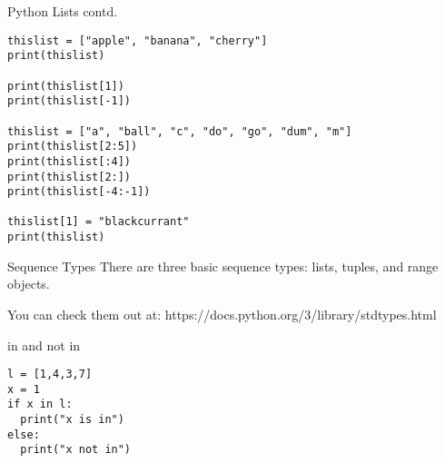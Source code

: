 \documentclass{beamer}
\begin{document}
\begin{frame}[fragile]{Python Lists contd.}
	\begin{verbatim}
thislist = ["apple", "banana", "cherry"]
print(thislist)
	
print(thislist[1])
print(thislist[-1])

thislist = ["a", "ball", "c", "do", "go", "dum", "m"]
print(thislist[2:5])
print(thislist[:4])
print(thislist[2:])
print(thislist[-4:-1])

thislist[1] = "blackcurrant"
print(thislist)
	\end{verbatim}
\end{frame}


\begin{frame}{Sequence Types}
	There are three basic sequence types: lists, tuples, and range objects. 

	You can check them out at: https://docs.python.org/3/library/stdtypes.html
\end{frame}

\begin{frame}[fragile]{in and not in}
	\begin{verbatim}
l = [1,4,3,7]
x = 1
if x in l:
  print("x is in")
else:
  print("x not in")
	\end{verbatim}
\end{frame}
\end{document}
